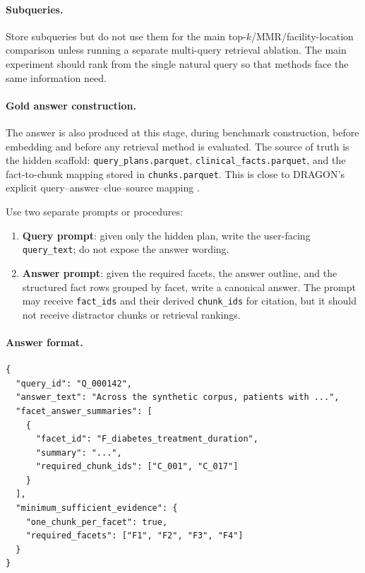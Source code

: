 \documentclass[11pt,a4paper]{article}
\newcommand{\field}[1]{\texttt{#1}}
\begin{document}
\paragraph{Subqueries.}
Store subqueries but do not use them for the main top-$k$/MMR/facility-location comparison unless running a separate multi-query retrieval ablation. The main experiment should rank from the single natural query so that methods face the same information need.

\paragraph{Gold answer construction.}
The answer is also produced at this stage, during benchmark construction, before embedding and before any retrieval method is evaluated. The source of truth is the hidden scaffold: \field{query\_plans.parquet}, \field{clinical\_facts.parquet}, and the fact-to-chunk mapping stored in \field{chunks.parquet}. This is close to DRAGON's explicit query--answer--clue--source mapping \citep{shen2026dragon}.

Use two separate prompts or procedures:

\begin{enumerate}[leftmargin=*]
	\item \textbf{Query prompt}: given only the hidden plan, write the user-facing \field{query\_text}; do not expose the answer wording.
	\item \textbf{Answer prompt}: given the required facets, the answer outline, and the structured fact rows grouped by facet, write a canonical answer. The prompt may receive \field{fact\_ids} and their derived \field{chunk\_ids} for citation, but it should not receive distractor chunks or retrieval rankings.
\end{enumerate}

\paragraph{Answer format.}

\begin{lstlisting}[style=promptstyle]
{
  "query_id": "Q_000142",
  "answer_text": "Across the synthetic corpus, patients with ...",
  "facet_answer_summaries": [
    {
      "facet_id": "F_diabetes_treatment_duration",
      "summary": "...",
      "required_chunk_ids": ["C_001", "C_017"]
    }
  ],
  "minimum_sufficient_evidence": {
    "one_chunk_per_facet": true,
    "required_facets": ["F1", "F2", "F3", "F4"]
  }
}
\end{lstlisting}
\end{document}
